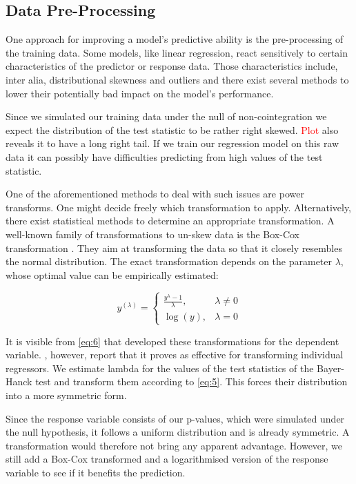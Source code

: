 \documentclass[12pt,a4paper]{article}
\begin{document}
\hypertarget{data-pre-processing}{%
\subsection{Data Pre-Processing}\label{data-pre-processing}}

One approach for improving a model's predictive ability is the
pre-processing of the training data. Some models, like linear
regression, react sensitively to certain characteristics of the
predictor or response data. Those characteristics include, inter alia,
distributional skewness and outliers and there exist several methods to
lower their potentially bad impact on the model's performance.

Since we simulated our training data under the null of non-cointegration
we expect the distribution of the test statistic to be rather right
skewed. \textcolor{red}{Plot} also reveals it to have a long right tail.
If we train our regression model on this raw data it can possibly have
difficulties predicting from high values of the test statistic.

One of the aforementioned methods to deal with such issues are power
transforms. One might decide freely which transformation to apply.
Alternatively, there exist statistical methods to determine an
appropriate transformation. A well-known family of transformations to
un-skew data is the Box-Cox transformation \autocite{Boxcox_1964}. They
aim at transforming the data so that it closely resembles the normal
distribution. The exact transformation depends on the parameter
\(\lambda\), whose optimal value can be empirically estimated:

\begin{equation}
y^{(\lambda)} =
    \begin{cases}
    \frac{y^{\lambda} - 1}{\lambda}, & \lambda \neq 0 \\
    \log{(y)}, & \lambda = 0
    \end{cases}
\label{eq:6}
\end{equation}

It is visible from \eqref{eq:6} that \textcite{Boxcox_1964} developed
these transformations for the dependent variable. \textcite{Kuhn_2013},
however, report that it proves as effective for transforming individual
regressors. We estimate lambda for the values of the test statistics of
the Bayer-Hanck test and transform them according to \eqref{eq:5}. This
forces their distribution into a more symmetric form.

Since the response variable consists of our p-values, which were
simulated under the null hypothesis, it follows a uniform distribution
and is already symmetric. A transformation would therefore not bring any
apparent advantage. However, we still add a Box-Cox transformed and a
logarithmised version of the response variable to see if it benefits the
prediction.
\end{document}
